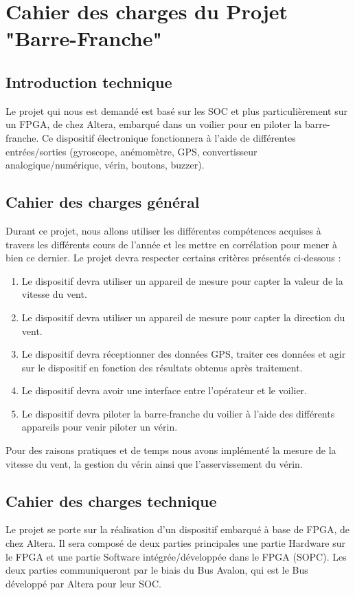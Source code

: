 \section{Cahier des charges du Projet "Barre-Franche"}
\subsection{Introduction technique}
Le projet qui nous est demandé est basé sur les SOC et plus particulièrement sur un FPGA, de chez Altera, embarqué dans un voilier pour en piloter la barre-franche.
\newline
Ce dispositif électronique fonctionnera à l'aide de différentes entrées/sorties (gyroscope, anémomètre, GPS, convertisseur analogique/numérique, vérin, boutons, buzzer).
\subsection{Cahier des charges général}
Durant ce projet, nous allons utiliser les différentes compétences acquises à travers les différents cours de l'année et les mettre en corrélation pour mener à bien ce dernier. Le projet devra respecter certains critères présentés ci-dessous :
\begin{enumerate}
    \item   Le dispositif devra utiliser un appareil de mesure pour capter la valeur de la vitesse du vent.
    \item   Le dispositif devra utiliser un appareil de mesure pour capter la direction du vent.
    \item   Le dispositif devra réceptionner des données GPS, traiter ces données et agir sur le dispositif en fonction des résultats obtenus après traitement.
    \item   Le dispositif devra avoir une interface entre l'opérateur et le voilier.
    \item   Le dispositif devra piloter la barre-franche du voilier à l'aide des différents appareils pour venir piloter un vérin. 
\end{enumerate}
Pour des raisons pratiques et de temps nous avons implémenté la mesure de la vitesse du vent, la gestion du vérin ainsi que l'asservissement du vérin.
\newpage
\subsection{Cahier des charges technique}
Le projet se porte sur la réalisation d'un dispositif embarqué à base de FPGA, de chez Altera. Il sera composé de deux parties principales une partie Hardware sur le FPGA et une partie Software intégrée/développée dans le FPGA (SOPC). Les deux parties communiqueront par le biais du Bus Avalon, qui est le Bus développé par Altera pour leur SOC.

